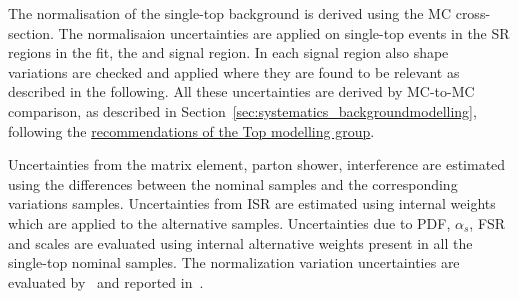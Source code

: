 The normalisation of the single-top background is derived using the MC cross-section. The normalisaion uncertainties are applied on single-top events in the SR regions in the fit, the \lephad and \hadhad signal region. In each signal region also shape variations are checked and applied where they are found to be relevant as described in the following. All these uncertainties are derived by MC-to-MC comparison, as described in Section~\ref{sec:systematics_backgroundmodelling}, following the \href{https://twiki.cern.ch/twiki/bin/view/AtlasProtected/TopMCSystematicsR21}{\underline{recommendations of the Top modelling group}}.

Uncertainties from the matrix element, parton shower, interference are estimated using the differences between the nominal samples and the corresponding variations samples.  Uncertainties from ISR are estimated using internal weights which are applied to the alternative samples.
Uncertainties due to PDF, $\alpha_s$, FSR and scales are evaluated using internal alternative weights present in all the single-top nominal samples. 
The normalization variation uncertainties are evaluated by~ and reported in~. %



